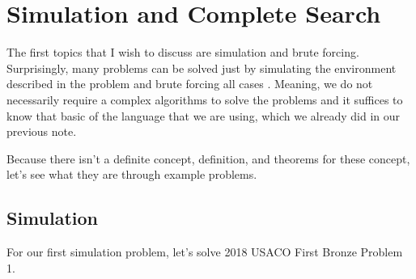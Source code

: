 \documentclass[../../../main.tex]{subfiles}
\begin{document}
\section{Simulation and Complete Search}

The first topics that I wish to discuss are simulation and brute
forcing. Surprisingly, many problems can be solved just by simulating
the environment described in the problem and brute forcing all cases
\cite{CS02-7}. Meaning, we do not necessarily require a complex
algorithms to solve the problems and it suffices to know that basic
of the language that we are using, which we already did in our
previous note.

Because there isn't a definite concept, definition, and theorems for
these concept, let's see what they are through example problems.

\subsection{Simulation}

For our first simulation problem, let's solve 2018 USACO First Bronze
Problem 1.
\end{document}
